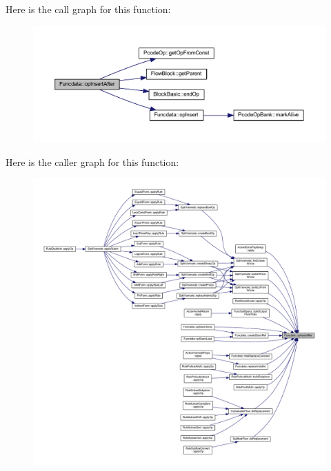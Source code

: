 Here is the call graph for this function\+:
\nopagebreak
\begin{figure}[H]
\begin{center}
\leavevmode
\includegraphics[width=350pt]{class_funcdata_a3320ad92e11a48a06e21b8a55395a56b_cgraph}
\end{center}
\end{figure}
Here is the caller graph for this function\+:
\nopagebreak
\begin{figure}[H]
\begin{center}
\leavevmode
\includegraphics[width=350pt]{class_funcdata_a3320ad92e11a48a06e21b8a55395a56b_icgraph}
\end{center}
\end{figure}
\mbox{\label{class_funcdata_a9dd86e17a47020d06ac8dfd3bb732fe5}} 
